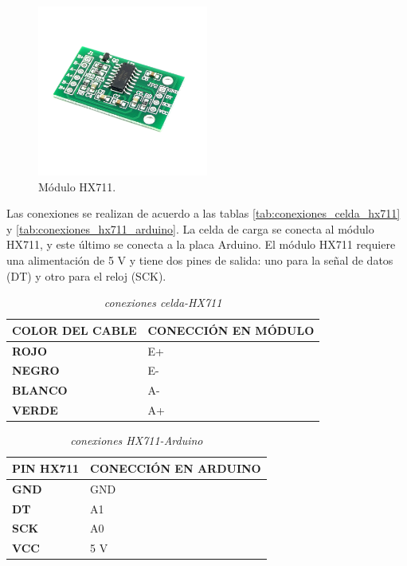 \begin{figure}[!ht]
    \centering
    \includegraphics[width=0.5\textwidth]{assets/metodos_herramientas/hx711.png}
    \caption{Módulo HX711.}
    \label{fig:hx711}
\end{figure}
Las conexiones se realizan de acuerdo a las tablas \ref{tab:conexiones_celda_hx711} y \ref{tab:conexiones_hx711_arduino}. La celda de carga se conecta al módulo HX711, y este último se conecta a la placa Arduino. El módulo HX711 requiere una alimentación de 5 V y tiene dos pines de salida: uno para la señal de datos (DT) y otro para el reloj (SCK).
\begin{table}[!ht]
    \centering
    \begin{tabularx}{\textwidth}{>{\bfseries}X X}
        \toprule
        \textbf{COLOR DEL CABLE} & \textbf{CONECCIÓN EN MÓDULO} \\
        \midrule
        ROJO                     & E+                           \\
        NEGRO                    & E-                           \\
        BLANCO                   & A-                           \\
        VERDE                    & A+                           \\
        \bottomrule
    \end{tabularx}
    \caption{\textit{conexiones celda-HX711}}
\end{table}
\begin{table}[!ht]
    \centering
    \begin{tabularx}{\textwidth}{>{\bfseries}X X}
        \toprule
        \textbf{PIN HX711} & \textbf{CONECCIÓN EN ARDUINO} \\
        \midrule
        GND                & GND                           \\
        DT                 & A1                            \\
        SCK                & A0                            \\
        VCC                & 5 V                           \\
        \bottomrule
    \end{tabularx}
    \caption{\textit{conexiones HX711-Arduino}}
\end{table}
\newpage

